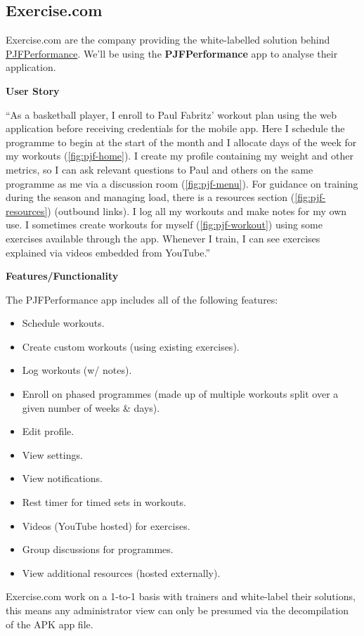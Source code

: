 \subsection{Exercise.com}
Exercise.com are the company providing the white-labelled solution behind \href{https://online.pjfperformance.net/users/sign_in/}{PJFPerformance}.
We'll be using the \textbf{PJFPerformance} app to analyse their application.


\pagebreak
\textbf{User Story}
\label{research-breakdown:pjf-usr-story}
\par
``As a basketball player, I enroll to Paul Fabritz' workout plan using the web application before
receiving credentials for the mobile app. Here I schedule the programme to begin
at the start of the month and I allocate days of the week for my workouts (\cref{fig:pjf-home}).
I create my profile containing my weight and other metrics, so I can ask relevant questions
to Paul and others on the same programme as me via a discussion room (\cref{fig:pjf-menu}). For guidance on training
during the season and managing load, there is a resources section (\cref{fig:pjf-resources}) (outbound links). I log all my workouts and make notes
for my own use. I sometimes create workouts for myself (\cref{fig:pjf-workout}) using some exercises available through the app.
Whenever I train, I can see exercises explained via videos embedded from YouTube.''

\textbf{Features/Functionality}
\label{research-breakdown:pjf-features}
\par
The PJFPerformance app includes all of the following features:
\begin{multicols}{2}
	\begin{itemize}[noitemsep]
		\item Schedule workouts.
		\item Create custom workouts (using existing exercises).
		\item Log workouts (w/ notes).
		\item Enroll on phased programmes (made up of multiple workouts split over
		a given number of weeks \& days).
		\item Edit profile.
		\item View settings.
		\item View notifications.
		\item Rest timer for timed sets in workouts.
		\item Videos (YouTube hosted) for exercises.
		\item Group discussions for programmes.
		\item View additional resources (hosted externally).
	\end{itemize}
\end{multicols}
\vspace*{-5mm}
Exercise.com work on a 1-to-1 basis with trainers and white-label their solutions, this means
any administrator view can only be presumed via the decompilation of the APK app file.

